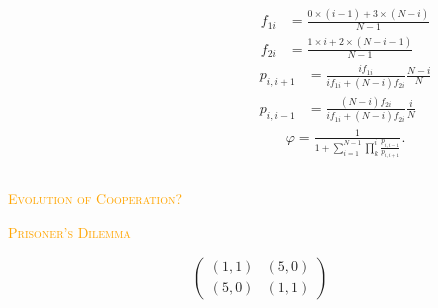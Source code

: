 \documentclass{beamer}
\begin{document}
\begin{frame}
    \begin{center}
    
    \end{center}
\end{frame}

\begin{frame}
    \begin{columns}
        \begin{column}{.5\textwidth}
            
        \end{column}
        \begin{column}{.5\textwidth}
            \begin{align*}
                f_{1i} & = \frac{0 \times (i - 1) + 3 \times (N - i)} {N - 1} \\
                f_{2i} & = \frac{1 \times i + 2 \times (N - i - 1)} {N - 1}
            \end{align*}
            \begin{align*}
                p_{i, i + 1} & = \frac{i f_{1i}} {i f_{1i} + (N - i) f_{2i}} \frac{N - i}{N}\\
                p_{i, i - 1} & = \frac{(N - i) f_{2i}} {i f_{1i} + (N - i) f_{2i}} \frac{i}{N}
            \end{align*}
            \begin{align*}
            \varphi = \frac{1}{1+\sum_{i=1}^{N-1}\prod_k^i \frac{p_{i, i - 1}}{p_{i, i + 1}}}.
        \end{align*}
        \end{column}
    \end{columns}
\end{frame}

\begin{frame}
    \begin{center}
        \Large
        \textcolor{orange}{\textsc{Evolution of Cooperation?}}
    \end{center}
\end{frame}


\begin{frame}
    \begin{center}
        \Large
        \textcolor{orange}{\textsc{Prisoner's Dilemma}}
    \end{center}
\end{frame}

\begin{frame}
    \begin{center}
    \LARGE{
        \begin{equation*}
            \begin{pmatrix}
                (1, 1) & (5, 0)  \\
                (5, 0) & (1, 1)
            \end{pmatrix}
        \end{equation*}}
    \end{center}
\end{frame}
\end{document}
